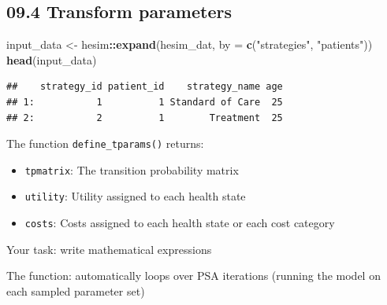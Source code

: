 \documentclass[
]{article}
\newenvironment{Shaded}{\begin{snugshade}}{\end{snugshade}}
\newcommand{\DataTypeTok}[1]{\textcolor[rgb]{0.13,0.29,0.53}{#1}}
\newcommand{\KeywordTok}[1]{\textcolor[rgb]{0.13,0.29,0.53}{\textbf{#1}}}
\newcommand{\NormalTok}[1]{#1}
\newcommand{\OperatorTok}[1]{\textcolor[rgb]{0.81,0.36,0.00}{\textbf{#1}}}
\newcommand{\StringTok}[1]{\textcolor[rgb]{0.31,0.60,0.02}{#1}}
\begin{document}
\hypertarget{transform-parameters}{%
\subsection{09.4 Transform parameters}\label{transform-parameters}}

\begin{Shaded}
\begin{Highlighting}[]
\NormalTok{input_data <-}\StringTok{ }\NormalTok{hesim}\OperatorTok{::}\KeywordTok{expand}\NormalTok{(hesim_dat, }\DataTypeTok{by =} \KeywordTok{c}\NormalTok{(}\StringTok{"strategies"}\NormalTok{, }\StringTok{"patients"}\NormalTok{))}
\KeywordTok{head}\NormalTok{(input_data)}
\end{Highlighting}
\end{Shaded}

\begin{verbatim}
##    strategy_id patient_id    strategy_name age
## 1:           1          1 Standard of Care  25
## 2:           2          1        Treatment  25
\end{verbatim}

The function \texttt{define\_tparams()} returns:

\begin{itemize}
\item
  \texttt{tpmatrix}: The transition probability matrix
\item
  \texttt{utility}: Utility assigned to each health state
\item
  \texttt{costs}: Costs assigned to each health state or each cost
  category
\end{itemize}

Your task: write mathematical expressions

The function: automatically loops over PSA iterations (running the model
on each sampled parameter set)
\end{document}
